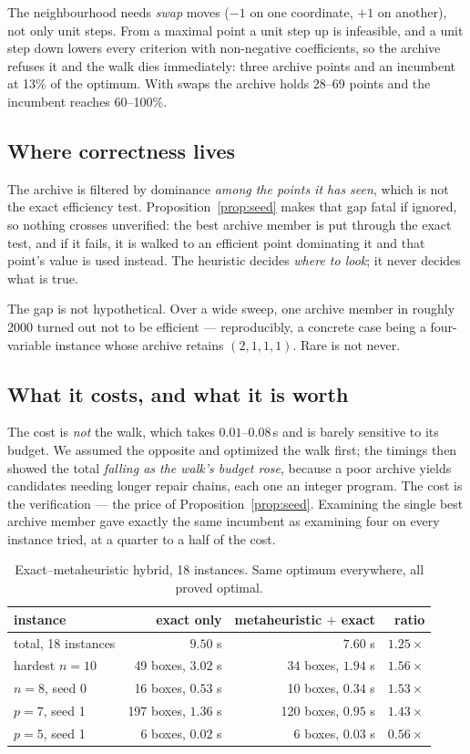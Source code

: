 \documentclass[11pt,a4paper]{article}
\begin{document}
The neighbourhood needs \emph{swap} moves ($-1$ on one coordinate, $+1$ on
another), not only unit steps. From a maximal point a unit step up is
infeasible, and a unit step down lowers every criterion with non-negative
coefficients, so the archive refuses it and the walk dies immediately: three
archive points and an incumbent at 13\% of the optimum. With swaps the archive
holds 28--69 points and the incumbent reaches 60--100\%.

\subsection{Where correctness lives}

The archive is filtered by dominance \emph{among the points it has seen}, which
is not the exact efficiency test. Proposition~\ref{prop:seed} makes that gap
fatal if ignored, so nothing crosses unverified: the best archive member is put
through the exact test, and if it fails, it is walked to an efficient point
dominating it and that point's value is used instead. The heuristic decides
\emph{where to look}; it never decides what is true.

The gap is not hypothetical. Over a wide sweep, one archive member in roughly
2000 turned out not to be efficient --- reproducibly, a concrete case being a
four-variable instance whose archive retains $(2,1,1,1)$. Rare is not never.

\subsection{What it costs, and what it is worth}

The cost is \emph{not} the walk, which takes $0.01$--$0.08$\,s and is barely
sensitive to its budget. We assumed the opposite and optimized the walk first;
the timings then showed the total \emph{falling as the walk's budget rose},
because a poor archive yields candidates needing longer repair chains, each one
an integer program. The cost is the verification --- the price of
Proposition~\ref{prop:seed}. Examining the single best archive member gave
exactly the same incumbent as examining four on every instance tried, at a
quarter to a half of the cost.

\begin{table}[h]
\centering
\caption{Exact--metaheuristic hybrid, 18 instances. Same optimum everywhere,
all proved optimal.}
\begin{tabular}{lrrr}
\toprule
instance & exact only & metaheuristic $+$ exact & ratio \\
\midrule
total, 18 instances & $9.50$ s & $7.60$ s & $1.25\times$ \\
\midrule
hardest $n=10$ & 49 boxes, $3.02$ s & 34 boxes, $1.94$ s & $1.56\times$ \\
$n=8$, seed 0  & 16 boxes, $0.53$ s & 10 boxes, $0.34$ s & $1.53\times$ \\
$p=7$, seed 1  & 197 boxes, $1.36$ s & 120 boxes, $0.95$ s & $1.43\times$ \\
$p=5$, seed 1  & 6 boxes, $0.02$ s  & 6 boxes, $0.03$ s   & $0.56\times$ \\
\bottomrule
\end{tabular}
\end{table}
\end{document}
